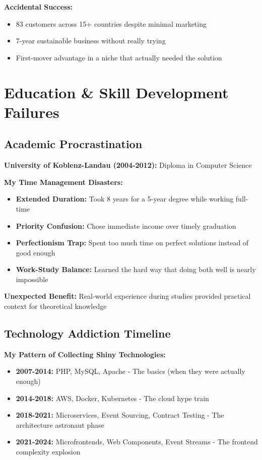 \documentclass[10pt,a4paper]{article}
\begin{document}
\textbf{Accidental Success:}
\begin{itemize}[leftmargin=10pt,itemsep=1pt]
\item 83 customers across 15+ countries despite minimal marketing
\item 7-year sustainable business without really trying
\item First-mover advantage in a niche that actually needed the solution
\end{itemize}

\section{Education \& Skill Development Failures}

\subsection{Academic Procrastination}
\textbf{University of Koblenz-Landau (2004-2012):} Diploma in Computer Science

\textbf{My Time Management Disasters:}
\begin{itemize}[leftmargin=10pt,itemsep=1pt]
\item \textbf{Extended Duration:} Took 8 years for a 5-year degree while working full-time
\item \textbf{Priority Confusion:} Chose immediate income over timely graduation
\item \textbf{Perfectionism Trap:} Spent too much time on perfect solutions instead of good enough
\item \textbf{Work-Study Balance:} Learned the hard way that doing both well is nearly impossible
\end{itemize}

\textbf{Unexpected Benefit:} Real-world experience during studies provided practical context for theoretical knowledge

\subsection{Technology Addiction Timeline}
\textbf{My Pattern of Collecting Shiny Technologies:}
\begin{itemize}[leftmargin=10pt,itemsep=1pt]
\item \textbf{2007-2014:} PHP, MySQL, Apache - The basics (when they were actually enough)
\item \textbf{2014-2018:} AWS, Docker, Kubernetes - The cloud hype train
\item \textbf{2018-2021:} Microservices, Event Sourcing, Contract Testing - The architecture astronaut phase
\item \textbf{2021-2024:} Microfrontends, Web Components, Event Streams - The frontend complexity explosion
\end{itemize}
\end{document}
